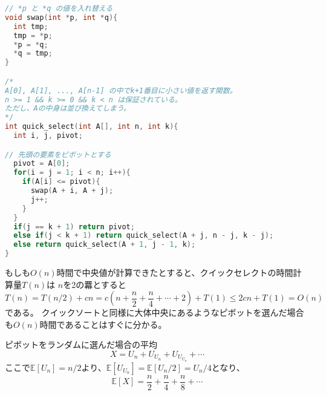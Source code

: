 \documentclass[a4paper,twoside,onecolumn,openany,article,10pt]{memoir}
\theoremstyle{remark}
\begin{document}
\begin{lstlisting}[basicstyle=\ttfamily\normalsize,showstringspaces=false,language=C,frame=single]
// *p と *q の値を入れ替える
void swap(int *p, int *q){
  int tmp;
  tmp = *p;
  *p = *q;
  *q = tmp;
}

/*
A[0], A[1], ..., A[n-1] の中でk+1番目に小さい値を返す関数。
n >= 1 && k >= 0 && k < n は保証されている。
ただし、Aの中身は並び換えてしまう。
*/
int quick_select(int A[], int n, int k){
  int i, j, pivot;

// 先頭の要素をピボットとする
  pivot = A[0];
  for(i = j = 1; i < n; i++){
    if(A[i] <= pivot){
      swap(A + i, A + j);
      j++;
    }
  }
  if(j == k + 1) return pivot;
  else if(j < k + 1) return quick_select(A + j, n - j, k - j);
  else return quick_select(A + 1, j - 1, k);
}
\end{lstlisting}

もしも$O(n)$時間で中央値が計算できたとすると、クイックセレクトの時間計算量$T(n)$は
$n$を2の羃とすると
\begin{equation*}
T(n) = T(n/2) + cn = c\left(n+\frac{n}2 + \frac{n}4 + \dotsb + 2\right) + T(1) \le 2c n + T(1) = O(n)
\end{equation*}
である。
クイックソートと同様に大体中央にあるようなピボットを選んだ場合も$O(n)$時間であることはすぐに分かる。

ピボットをランダムに選んだ場合の平均
\begin{equation*}
X = U_n + U_{U_n} + U_{U_{U_n}} + \dotsb
\end{equation*}
ここで$\mathbb{E}[U_n] = n/2$より、$\mathbb{E}[U_{U_n}] = \mathbb{E}[U_n/2] = U_n/4$となり、
\begin{equation*}
\mathbb{E}[X] =  \frac{n}2 + \frac{n}4 + \frac{n}8 + \dotsb
\end{equation*}
\fi

\end{document}
